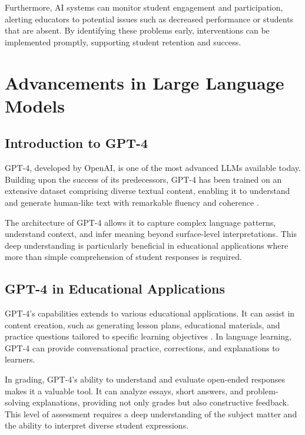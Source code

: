 \documentclass[ms,twoside,print]{nuthesis}
\begin{document}
Furthermore, AI systems can monitor student engagement and participation, alerting educators to potential issues such as decreased performance or students that are absent. By identifying these problems early, interventions can be implemented promptly, supporting student retention and success.

\section{Advancements in Large Language Models}

\subsection{Introduction to GPT-4}

GPT-4, developed by OpenAI, is one of the most advanced LLMs available today. Building upon the success of its predecessors, GPT-4 has been trained on an extensive dataset comprising diverse textual content, enabling it to understand and generate human-like text with remarkable fluency and coherence \cite{Alto2023}.

The architecture of GPT-4 allows it to capture complex language patterns, understand context, and infer meaning beyond surface-level interpretations. This deep understanding is particularly beneficial in educational applications where more than simple comprehension of student responses is required.

\subsection{GPT-4 in Educational Applications}

GPT-4's capabilities extends to various educational applications. It can assist in content creation, such as generating lesson plans, educational materials, and practice questions tailored to specific learning objectives \cite{Alto2023}. In language learning, GPT-4 can provide conversational practice, corrections, and explanations to learners.

In grading, GPT-4's ability to understand and evaluate open-ended responses makes it a valuable tool. It can analyze essays, short answers, and problem-solving explanations, providing not only grades but also constructive feedback. This level of assessment requires a deep understanding of the subject matter and the ability to interpret diverse student expressions.

\end{document}
